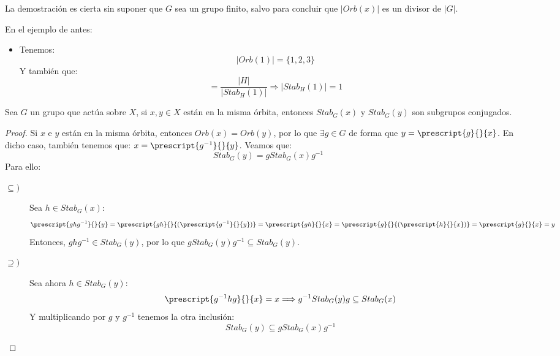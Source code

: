 \begin{observacion}
La demostración es cierta sin suponer que $G$ sea un grupo finito, salvo para concluir que $|Orb(x)|$ es un divisor de $|G|$.
\end{observacion}

\begin{ejemplo}
    En el ejemplo de antes:
    \begin{itemize}
        \item Tenemos:
            \begin{equation*}
                |Orb(1)| = \{1,2,3\}
            \end{equation*}
            Y también que:
            \begin{equation*}
                [H:Stab_H(1)] = \dfrac{|H|}{|Stab_H(1)|} \Longrightarrow |Stab_H(1)| = 1
            \end{equation*}
    \end{itemize}
\end{ejemplo}

\begin{prop}
    Sea $G$ un grupo que actúa sobre $X$, si $x,y\in X$ están en la misma órbita, entonces $Stab_G(x)$ y $Stab_G(y)$ son subgrupos conjugados.
    \begin{proof}
        Si $x$ e $y$ están en la misma órbita, entonces $Orb(x) = Orb(y)$, por lo que $\exists g\in G$ de forma que $y = \prescript{g}{}{x}$. En dicho caso, también tenemos que: $x = \prescript{g^{-1}}{}{y}$. Veamos que:
        \begin{equation*}
            Stab_G(y) = gStab_G(x)g^{-1}
        \end{equation*}
        Para ello:
        \begin{description}
            \item [$\subseteq)$] Sea $h\in Stab_G(x)$:
                \begin{equation*}
                    \prescript{ghg^{-1}}{}{y} = \prescript{gh}{}{(\prescript{g^{-1}}{}{y})} = \prescript{gh}{}{x} = \prescript{g}{}{(\prescript{h}{}{x})} = \prescript{g}{}{x} = y
                \end{equation*}
                Entonces, $ghg^{-1}\in Stab_G(y)$, por lo que $gStab_G(y)g^{-1} \subseteq Stab_G(y)$.
            \item [$\supseteq)$] Sea ahora $h\in Stab_G(y)$:
                \begin{equation*}
                    \prescript{g^{-1}hg}{}{x} = x \Longrightarrow g^{-1}Stab_G(y)g \subseteq Stab_G(x)
                \end{equation*}
                Y multiplicando por $g$ y $g^{-1}$ tenemos la otra inclusión:
                \begin{equation*}
                    Stab_G(y) \subseteq gStab_G(x)g^{-1}
                \end{equation*} \qedhere
        \end{description}
    \end{proof}
\end{prop}

